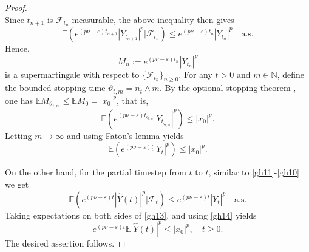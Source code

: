\documentclass[preprint,12pt,compress]{elsarticle}
\begin{document}
\begin{proof}
\begin{equation*}
\end{equation*}
Since $t_{n+1}$ is $\mathcal{F}_{t_n}$-measurable, the above inequality then gives
\begin{equation}  \label{gh10}
	\mathbb{E}\left( {{e^{\left( {{p\nu } - \varepsilon } \right){t_{n + 1}}}}{{\left| {{Y_{{t_{n + 1}}}}} \right|}^p}|{\mathcal{F}_{{t_n}}}} \right) \le {e^{\left( {{p\nu } - \varepsilon } \right){t_n}}}{\left| {{Y_{{t_n}}}} \right|^p} \quad \text{a.s.}
\end{equation}
Hence, 
\begin{equation*}
	{M_n} := {e^{\left( {p\nu  - \varepsilon } \right){t_n}}}{\left| {{Y_{{t_n}}}} \right|^p}
\end{equation*}
is a supermartingale with respect to ${\{ {\mathcal{F}_{{t_n}}}\} _{n \ge 0}}$. For any $t > 0$ and $m \in \mathbb{N}$, define the bounded stopping time ${\vartheta  _{t,m}} = {n_t} \wedge m$. By the optional stopping theorem \cite[Theorem 7.14, p.~189]{klebaner2012introduction}, one has $\mathbb{E}{M_{{\vartheta _{t,m}} }} \le \mathbb{E}{M_0} = |x_0|^p$, that is,
\begin{equation*}
	\mathbb{E}\left( {{e^{\left( {p\nu  - \varepsilon } \right){t_{{\varsigma _{t,m}}}}}}{{\left| {{Y_{{t_{{\varsigma _{t,m}}}}}}} \right|}^p}} \right) \le {\left| {{x_0}} \right|^p}.
\end{equation*}
Letting $m \to \infty$ and using Fatou's lemma yields
\begin{equation}  \label{gh14}
	\mathbb{E}\left( {{e^{\left( {p\nu  - \varepsilon } \right)\underline{t}}}{{\left| {{Y_{\underline{t}}}} \right|}^p}} \right) \le {\left| {{x_0}} \right|^p} .
\end{equation}

On the other hand, for the partial timestep from $\underline{t}$ to $t$, similar to \eqref{gh11}-\eqref{gh10} we get
\begin{equation}  \label{gh13}
	\mathbb{E}\left( {{e^{\left( {{p\nu } - \varepsilon } \right)t}}{{\left| {\hat Y(t)} \right|}^p}|{\mathcal{F}_{{\underline{t}}}}} \right) \le {e^{\left( {{p\nu } - \varepsilon } \right){\underline{t}}}}{\left| {{Y_{{\underline{t}}}}} \right|^p} \quad \text{a.s.}
\end{equation}
Taking expectations on both sides of \eqref{gh13}, and  using \eqref{gh14} yields
\begin{equation*}
	{e^{\left( {p\nu  - \varepsilon } \right)t}}\mathbb{E}{\left| {\hat Y(t)} \right|^p} \le {\left| {{x_0}} \right|^p}, \quad  t \ge 0.
\end{equation*}
The desired assertion follows.
\end{proof}
\end{document}
